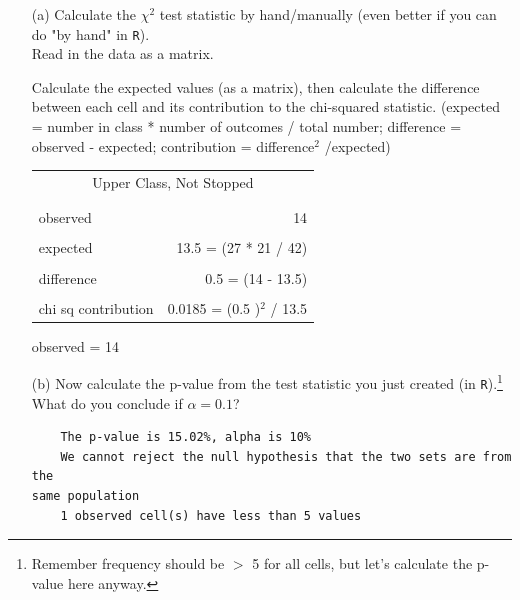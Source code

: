 \documentclass[12pt,letterpaper]{article}
\begin{document}
\begin{enumerate}


	
	\item [(a)]
	Calculate the $\chi^2$ test statistic by hand/manually (even better if you can do "by hand" in \texttt{R}).\\
	
	Read in the data as a matrix.
	  

	Calculate the expected values (as a matrix), then calculate the difference 
	between each cell and its contribution to the chi-squared statistic. 
	(expected = number in class * number of outcomes / total number;
		difference = observed - expected; contribution = difference$^2$ /expected) %
	
	
	\begin{table}[htb]
		\centering
		\begin{tabular}{l | r}
			\multicolumn{2}{c}{Upper Class, Not Stopped} \\
			\\[-1.8ex] 
			\hline \\[-1.8ex]
			observed  &  14  \\
			\\
			expected  &  13.5 = (27 * 21 / 42)\\
			\\
			difference  &  0.5  = (14 - 13.5)\\
			\\
			chi sq contribution  &  0.0185  = (0.5 )$^2$ / 13.5\\
			
		\end{tabular}
	\end{table}
	observed = 14
	
	
	
	
	  

	\item [(b)]
	Now calculate the p-value from the test statistic you just created (in \texttt{R}).\footnote{Remember frequency should be $>$ 5 for all cells, but let's calculate the p-value here anyway.}  What do you conclude if $\alpha = 0.1$?\\
	
	  
	
	\begin{verbatim}
	The p-value is 15.02%, alpha is 10%
	We cannot reject the null hypothesis that the two sets are from the
same population
	1 observed cell(s) have less than 5 values
	\end{verbatim}


\end{enumerate}
\end{document}
